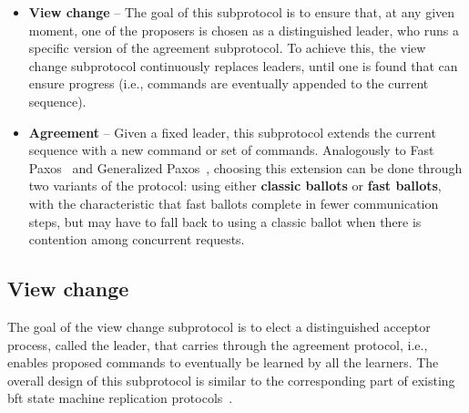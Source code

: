 \begin{itemize}
	
	\item
	{\bf View change} -- The goal of this subprotocol is to ensure that, at any given moment, one of the proposers is chosen as a distinguished leader, who runs a specific version of the agreement subprotocol. To achieve this, the view change subprotocol continuously replaces leaders, until one is found that can ensure progress (i.e., commands are eventually appended to the current sequence).
	
	\item
	{\bf Agreement} -- Given a fixed leader, this subprotocol extends the current sequence with a new command or set of commands. Analogously to Fast Paxos~\cite{L06} and Generalized Paxos~\cite{Lamport2005}, choosing this extension can be done through two variants of the protocol: using either {\bf classic ballots} or {\bf fast ballots}, with the characteristic that fast ballots complete in fewer communication steps, but may have to fall back to using a classic ballot when there is contention among concurrent requests.
	
\end{itemize}

\subsection{View change} 

The goal of the view change subprotocol is to elect a distinguished acceptor process, called the leader, that carries through the agreement protocol, i.e., enables proposed commands to eventually be learned by all the learners. The overall design of this subprotocol is similar to the corresponding part of existing \acrshort{bft} state machine replication protocols~\cite{CL99}.\par

